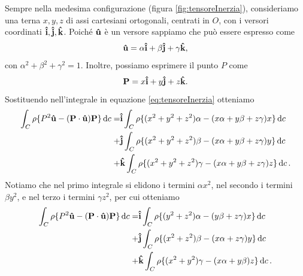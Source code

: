 Sempre nella medesima configurazione (figura \ref{fig:tensoreInerzia}), consideriamo una terna $x,y,z$ di assi cartesiani ortogonali, centrati in $O$, con i versori coordinati $\vu{i},\vu{j},\vu{k}$. Poiché $\vu{u}$ è un versore sappiamo che può essere espresso come
\begin{equation*}
    \vu{u} = \alpha \vu{i} + \beta \vu{j} + \gamma \vu{k},
\end{equation*}
con $\alpha^2 + \beta^2 + \gamma^2 = 1$. Inoltre, possiamo esprimere il punto $P$ come
\begin{equation*}
    \vb{P} = x\vu{i} + y\vu{j} + z\vu{k}.
\end{equation*}
Sostituendo nell'integrale in equazione \eqref{eq:tensoreInerzia} otteniamo
\begin{align*}
    \int_C \rho\{ P^2\vu{u} - (\vb{P}\cdot\vu{u})\vb{P} \}\dd{c}
    = &\vu{i}\int_C \rho \{ (x^2+y^2+z^2)\alpha - (x\alpha + y\beta + z\gamma)x \} \dd{c} \\
    + &\vu{j}\int_C \rho \{ (x^2+y^2+z^2)\beta - (x\alpha + y\beta + z\gamma)y \} \dd{c} \\
    + &\vu{k}\int_C \rho \{ (x^2+y^2+z^2)\gamma - (x\alpha + y\beta + z\gamma)z \} \dd{c}.
\end{align*}
Notiamo che nel primo integrale si elidono i termini $\alpha x^2$, nel secondo i termini $\beta y^2$, e nel terzo i termini $\gamma z^2$, per cui otteniamo
\begin{align*}
    \int_C \rho\{ P^2\vu{u} - (\vb{P}\cdot\vu{u})\vb{P} \}\dd{c}
    = &\vu{i}\int_C \rho \{ (y^2+z^2)\alpha - ( y\beta + z\gamma)x \} \dd{c} \\
    + &\vu{j}\int_C \rho \{ (x^2+z^2)\beta - (x\alpha + z\gamma)y \} \dd{c} \\
    + &\vu{k}\int_C \rho \{ (x^2+y^2)\gamma - (x\alpha + y\beta)z \} \dd{c}.
\end{align*}

